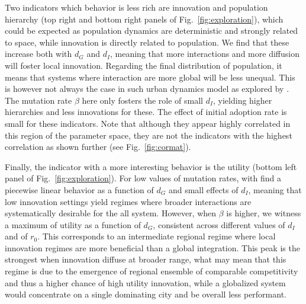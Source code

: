 \documentclass[letterpaper]{article}
\begin{document}
Two indicators which behavior is less rich are innovation and population hierarchy (top right and bottom right panels of Fig.~\ref{fig:exploration}), which could be expected as population dynamics are deterministic and strongly related to space, while innovation is directly related to population. We find that these increase both with $d_G$ and $d_I$, meaning that more interactions and more diffusion will foster local innovation. Regarding the final distribution of population, it means that systems where interaction are more global will be less unequal. This is however not always the case in such urban dynamics model as explored by \cite{raimbault2020hierarchy}. The mutation rate $\beta$ here only fosters the role of small $d_I$, yielding higher hierarchies and less innovations for these. The effect of initial adoption rate is small for these indicators. Note that although they appear highly correlated in this region of the parameter space, they are not the indicators with the highest correlation as shown further (see Fig.~\ref{fig:cormat}).

Finally, the indicator with a more interesting behavior is the utility (bottom left panel of Fig.~\ref{fig:exploration}). For low values of mutation rates, with find a piecewise linear behavior as a function of $d_G$ and small effects of $d_I$, meaning that low innovation settings yield regimes where broader interactions are systematically desirable for the all system. However, when $\beta$ is higher, we witness a maximum of utility as a function of $d_G$, consistent across different values of $d_I$ and of $r_0$. This corresponds to an intermediate regional regime where local innovation regimes are more beneficial than a global integration. This peak is the strongest when innovation diffuse at broader range, what may mean that this regime is due to the emergence of regional ensemble of comparable competitivity and thus a higher chance of high utility innovation, while a globalized system would concentrate on a single dominating city and be overall less performant.



\end{document}
